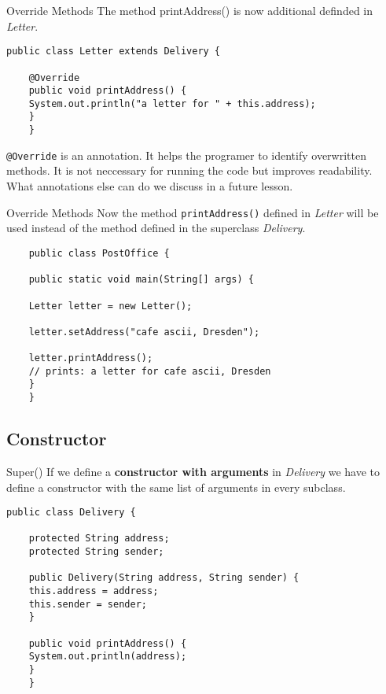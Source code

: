 \begin{frame}[fragile]{Override Methods}
	The method printAddress() is now additional definded in \emph{Letter}.
	\begin{lstlisting}[escapechar=!]
	public class Letter extends Delivery {
	
	@Override
	public void printAddress() {
	System.out.println("a letter for " + this.address);    
	}	
	}
	\end{lstlisting}
	\texttt{@Override} is an annotation. 
	It helps the programer to identify overwritten methods.
	It is not neccessary for running the code but improves readability.
	What annotations else can do we discuss in a future lesson.
\end{frame}
\begin{frame}[fragile]{Override Methods}
	Now the method \texttt{printAddress()} defined in \emph{Letter} will be used instead of the method defined
	in the superclass \emph{Delivery}.
	\begin{lstlisting}
	public class PostOffice {
	
	public static void main(String[] args) {
	
	Letter letter = new Letter();
	
	letter.setAddress("cafe ascii, Dresden");
	
	letter.printAddress();
	// prints: a letter for cafe ascii, Dresden
	}	
	}
	\end{lstlisting}
\end{frame}

\subsection{Constructor}
\begin{frame}[fragile]{Super()}
	If we define a \textbf{constructor with arguments} in \emph{Delivery} we have to define a constructor
	with the same list of arguments in every subclass.
	\begin{lstlisting}[basicstyle=\ttfamily\scriptsize]
	public class Delivery {
	
	protected String address;
	protected String sender;
	
	public Delivery(String address, String sender) {
	this.address = address;
	this.sender = sender;
	}
	
	public void printAddress() {
	System.out.println(address);
	}
	}
	\end{lstlisting}
\end{frame}

